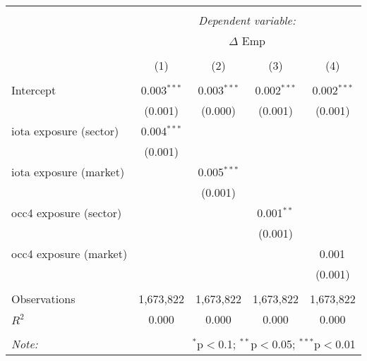 \begin{tabular}{@{\extracolsep{5pt}}lcccc}
\\[-1.8ex]\hline
\hline \\[-1.8ex]
& \multicolumn{4}{c}{\textit{Dependent variable:}} \
\cr \cline{4-5}
\\[-1.8ex] & \multicolumn{4}{c}{$\Delta$ Emp}  \\
\\[-1.8ex] & (1) & (2) & (3) & (4) \\
\hline \\[-1.8ex]
 Intercept & 0.003$^{***}$ & 0.003$^{***}$ & 0.002$^{***}$ & 0.002$^{***}$ \\
  & (0.001) & (0.000) & (0.001) & (0.001) \\
 iota exposure (sector) & 0.004$^{***}$ & & & \\
  & (0.001) & & & \\
 iota exposure (market) & & 0.005$^{***}$ & & \\
  & & (0.001) & & \\
 occ4 exposure (sector) & & & 0.001$^{**}$ & \\
  & & & (0.001) & \\
 occ4 exposure (market) & & & & 0.001$^{}$ \\
  & & & & (0.001) \\
\hline \\[-1.8ex]
 Observations & 1,673,822 & 1,673,822 & 1,673,822 & 1,673,822 \\
 $R^2$ & 0.000 & 0.000 & 0.000 & 0.000 \\
\hline
\hline \\[-1.8ex]
\textit{Note:} & \multicolumn{4}{r}{$^{*}$p$<$0.1; $^{**}$p$<$0.05; $^{***}$p$<$0.01} \\
\end{tabular}